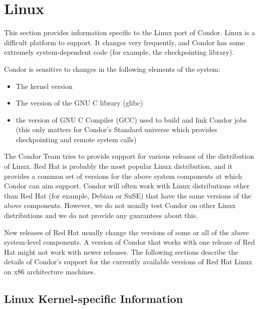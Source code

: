 \section{\label{sec:platform-linux}Linux}

This section provides information specific to the Linux port of
Condor.
Linux is a difficult platform to support.
It changes very frequently, and Condor has some extremely
system-dependent code (for example, the checkpointing library).

Condor is sensitive to changes in the following elements of the
system: 
\begin{itemize}
\item The kernel version
\item The version of the GNU C library (glibc)
\item the version of GNU C Compiler (GCC) used to build and link
  Condor jobs (this only matters for Condor's Standard universe which
  provides checkpointing and remote system calls)
\end{itemize}

The Condor Team tries to provide support for various releases of the
distribution of Linux.
Red Hat is probably the most popular Linux distribution, and it
provides a common set of versions for the above system components
at which Condor can aim support.
Condor will often work with Linux distributions other than Red Hat (for
example, Debian or SuSE) that have the same versions of the above
components.
However, we do not usually test Condor on other Linux distributions
and we do not provide any guarantees about this.

New releases of Red Hat usually change the versions of some or all of
the above system-level components.
A version of Condor that works with one release of Red Hat might not
work with newer releases.
The following sections describe the details of Condor's support for
the currently available versions of Red Hat Linux on x86 architecture
machines.

\subsection{\label{sec:platform-linux-activity}Linux Kernel-specific Information}

